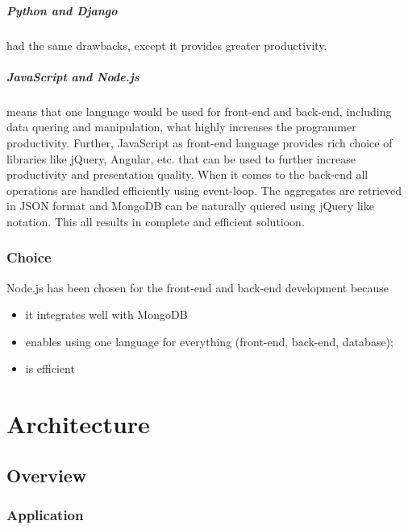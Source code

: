\documentclass[11pt, a4paper]{report}
\begin{document}
\paragraph{Python and Django} had the same drawbacks, except it provides greater productivity.

\paragraph{JavaScript and Node.js} means that one language would be used for front-end and back-end, including data quering and manipulation, what highly increases the programmer productivity. Further, JavaScript as front-end language provides rich choice of libraries like jQuery, Angular, etc. that can be used to further increase productivity and presentation quality. When it comes to the back-end all operations are handled efficiently using event-loop. The aggregates are retrieved in JSON format and MongoDB can be naturally quiered using jQuery like notation. This all results in complete and efficient solutioon.

\subsection{Choice}

Node.js has been chosen for the front-end and back-end development because
\begin{itemize}
  \item it integrates well with MongoDB
  \item enables using one language for everything (front-end, back-end, database);
  \item is efficient 
\end{itemize}


\chapter{Architecture}

\section{Overview}

\subsection{Application}
\end{document}
